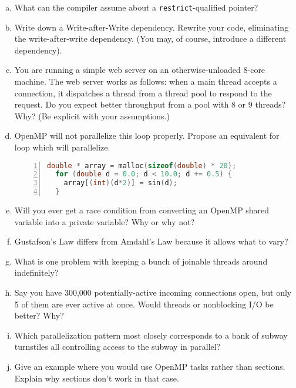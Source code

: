 \documentclass[12pt]{article}
\begin{document}
\begin{enumerate}[(a)]
\item What can the compiler assume about a {\tt restrict}-qualified pointer?
\item Write down a Write-after-Write dependency. Rewrite your code, eliminating the write-after-write dependency. (You may, of course, introduce a different dependency).
\item You are running a simple web server on an otherwise-unloaded 8-core machine. The web server works as follows: when a main thread accepts a connection, it dispatches a thread from a thread pool to respond to the request. Do you expect better throughput from a pool with 8 or 9 threads? Why? (Be explicit with your assumptions.)
\item OpenMP will not parallelize this loop properly. Propose an equivalent for loop which will
parallelize.

\hspace*{1in}\begin{minipage}{.5\textwidth}\begin{lstlisting}[language=C,numbers=left,numberstyle=\tiny]
  double * array = malloc(sizeof(double) * 20);
  for (double d = 0.0; d < 10.0; d += 0.5) {
    array[(int)(d*2)] = sin(d);
  }
\end{lstlisting}
\end{minipage}
\item Will you ever get a race condition from converting an OpenMP shared variable into a private variable? Why or why not? 
\item Gustafson's Law differs from Amdahl's Law because it allows what to vary?
\item What is one problem with keeping a bunch of joinable threads around indefinitely?
\item Say you have 300,000 potentially-active incoming connections open, but only 5 of them 
are ever active at once. Would threads or nonblocking I/O be better? Why?
\item Which parallelization pattern most closely corresponds to a bank of subway turnstiles all
controlling access to the subway in parallel?
\item Give an example where you would use OpenMP tasks rather than sections. Explain why 
sections don't work in that case.
\end{enumerate}
\end{document}

